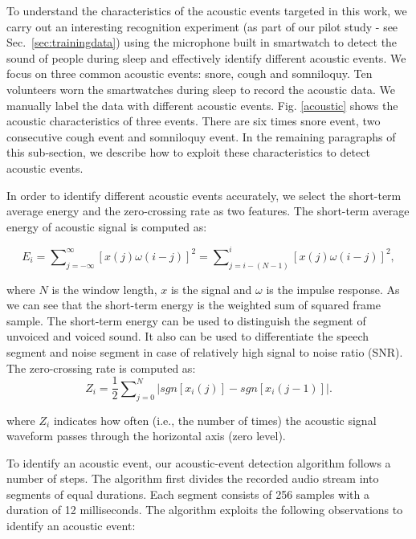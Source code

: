  To understand the characteristics of the acoustic events targeted in this work,  we carry out
an interesting recognition experiment (as part of our pilot study - see Sec.~\ref{sec:trainingdata}) using the microphone built in
smartwatch to detect the sound of people during sleep and effectively identify different acoustic events. We focus on three common acoustic
events: snore, cough and somniloquy. Ten volunteers worn the smartwatches during sleep to record the acoustic data. We manually label the
data with different acoustic events. Fig. \ref{acoustic} shows the acoustic characteristics of three events. There are six times snore
event, two consecutive cough event and somniloquy event. In the remaining paragraphs of this sub-section, we describe how to exploit these
characteristics to detect acoustic events.



 In order to identify different acoustic events accurately, we select the short-term average
energy and the zero-crossing rate as two features. The short-term average energy of acoustic signal is computed as:

\begin{equation}
  E_i=\sum\nolimits_{j=-\infty}^{\infty}[x(j)\omega(i-j)]^2=\sum\nolimits_{j=i-(N-1)}^{i}[x(j)\omega(i-j)]^2,
  \label{eq:shorte}
\end{equation}

where $N$ is the window length, $x$ is the signal and $\omega$ is the impulse response. As we can see that the short-term energy is the
weighted sum of squared frame sample. The short-term energy can be used to distinguish the segment of unvoiced and voiced sound. It also
can be used to differentiate the speech segment and noise segment  in  case of relatively high signal to noise ratio (SNR). The
zero-crossing rate is computed as:
\begin{equation}
  Z_i = \frac{1}{2}\sum\nolimits_{j=0}^{N}|sgn[x_i(j)]-sgn[x_i(j-1)]|.
  \label{eq:zeroc}
\end{equation}


where $Z_i$ indicates how often (i.e., the number of times) the acoustic signal waveform passes through the horizontal axis (zero level).



 To identify an acoustic event, our acoustic-event detection algorithm follows a number of steps.
The algorithm first divides the recorded audio stream into segments of equal durations. Each
 segment consists of 256 samples with a duration of 12 milliseconds. The algorithm exploits the following observations to identify an
 acoustic event:

